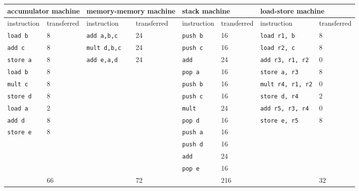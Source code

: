 \documentclass{article}
\begin{document}
\begin{tabular}{l|ll|ll|ll|l|}
\hline
\multicolumn{2}{|l|}{accumulator machine} & \multicolumn{2}{|l|}{memory-memory machine} & \multicolumn{2}{|l|}{stack machine} & \multicolumn{2}{|l|}{load-store machine} \\ \hline
\multicolumn{1}{|l|}{instruction} & transferred & \multicolumn{1}{|l|}{instruction} & transferred & \multicolumn{1}{|l|}{instruction} & transferred & \multicolumn{1}{|l|}{instruction} & transferred \\ \hline
\multicolumn{1}{|l|}{\texttt{load b}} & 8 & \multicolumn{1}{|l|}{\texttt{add a,b,c}} & 24 & \multicolumn{1}{|l|}{\texttt{push b}} & 16 &\multicolumn{1}{|l|}{\texttt{load r1, b}} & 8 \\ 
\multicolumn{1}{|l|}{\texttt{add c}} & 8 &\multicolumn{1}{|l|}{\texttt{mult d,b,c}} & 24 & \multicolumn{1}{|l|}{\texttt{push c}} & 16 & \multicolumn{1}{|l|}{\texttt{load r2, c}} & 8 \\
\multicolumn{1}{|l|}{\texttt{store a}} & 8 & \multicolumn{1}{|l|}{\texttt{add e,a,d}} & 24 & \multicolumn{1}{|l|}{\texttt{add}} & 24 & \multicolumn{1}{|l|}{\texttt{add r3, r1, r2}} & 0\\
\multicolumn{1}{|l|}{\texttt{load b}} & 8 & \multicolumn{1}{|l|}{} & & \multicolumn{1}{|l|}{\texttt{pop a}} & 16 & \multicolumn{1}{|l|}{\texttt{store a, r3}} & 8\\
\multicolumn{1}{|l|}{\texttt{mult c}} & 8 & \multicolumn{1}{|l|}{} & & \multicolumn{1}{|l|}{\texttt{push b}} & 16 & \multicolumn{1}{|l|}{\texttt{mult r4, r1, r2}} & 0 \\
\multicolumn{1}{|l|}{\texttt{store d}} & 8 & \multicolumn{1}{|l|}{} & &\multicolumn{1}{|l|}{\texttt{push c}} & 16 & \multicolumn{1}{|l|}{\texttt{store d, r4}} & 2\\ 
\multicolumn{1}{|l|}{\texttt{load a}} & 2 & \multicolumn{1}{|l|}{} & & \multicolumn{1}{|l|}{\texttt{mult}} & 24 & \multicolumn{1}{|l|}{\texttt{add r5, r3, r4}} & 0 \\
\multicolumn{1}{|l|}{\texttt{add d}} & 8 & \multicolumn{1}{|l|}{} & & \multicolumn{1}{|l|}{\texttt{pop d}} & 16 & \multicolumn{1}{|l|}{\texttt{store e, r5}} & 8\\
\multicolumn{1}{|l|}{\texttt{store e}} & 8 & \multicolumn{1}{|l|}{} & & \multicolumn{1}{|l|}{\texttt{push a}} & 16 & \multicolumn{1}{|l|}{} & \\
\multicolumn{1}{|l|}{} & & \multicolumn{1}{|l|}{} & & \multicolumn{1}{|l|}{\texttt{push d}} & 16 & \multicolumn{1}{|l|}{} & \\ 
\multicolumn{1}{|l|}{} & & \multicolumn{1}{|l|}{} & & \multicolumn{1}{|l|}{\texttt{add}} & 24 & \multicolumn{1}{|l|}{} &\\
\multicolumn{1}{|l|}{} & & \multicolumn{1}{|l|}{} & & \multicolumn{1}{|l|}{\texttt{pop e}} & 16 & \multicolumn{1}{|l|}{} &\\
\hline
 & \multicolumn{1}{|l|}{66} & & \multicolumn{1}{|l|}{72} & & \multicolumn{1}{|l|}{216} & & \multicolumn{1}{|l|}{32} \\
 \cline{2-2}\cline{4-4}\cline{6-6}\cline{8-8}
\end{tabular}
\end{document}
